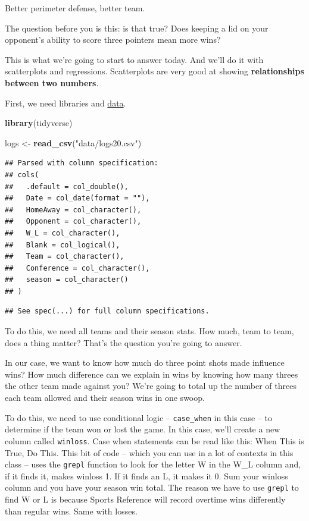 \documentclass[
]{book}
\newenvironment{Shaded}{\begin{snugshade}}{\end{snugshade}}
\newcommand{\KeywordTok}[1]{\textcolor[rgb]{0.13,0.29,0.53}{\textbf{#1}}}
\newcommand{\NormalTok}[1]{#1}
\newcommand{\StringTok}[1]{\textcolor[rgb]{0.31,0.60,0.02}{#1}}
\begin{document}
Better perimeter defense, better team.

The question before you is this: is that true? Does keeping a lid on your opponent's ability to score three pointers mean more wins?

This is what we're going to start to answer today. And we'll do it with scatterplots and regressions. Scatterplots are very good at showing \textbf{relationships between two numbers}.

First, we need libraries and \href{https://unl.box.com/s/yc01x7ae7r2jtuixo4j3s3s0ed7o5f8g}{data}.

\begin{Shaded}
\begin{Highlighting}[]
\KeywordTok{library}\NormalTok{(tidyverse)}
\end{Highlighting}
\end{Shaded}

\begin{Shaded}
\begin{Highlighting}[]
\NormalTok{logs <-}\StringTok{ }\KeywordTok{read_csv}\NormalTok{(}\StringTok{"data/logs20.csv"}\NormalTok{)}
\end{Highlighting}
\end{Shaded}

\begin{verbatim}
## Parsed with column specification:
## cols(
##   .default = col_double(),
##   Date = col_date(format = ""),
##   HomeAway = col_character(),
##   Opponent = col_character(),
##   W_L = col_character(),
##   Blank = col_logical(),
##   Team = col_character(),
##   Conference = col_character(),
##   season = col_character()
## )
\end{verbatim}

\begin{verbatim}
## See spec(...) for full column specifications.
\end{verbatim}

To do this, we need all teams and their season stats. How much, team to team, does a thing matter? That's the question you're going to answer.

In our case, we want to know how much do three point shots made influence wins? How much difference can we explain in wins by knowing how many threes the other team made against you? We're going to total up the number of threes each team allowed and their season wins in one swoop.

To do this, we need to use conditional logic -- \texttt{case\_when} in this case -- to determine if the team won or lost the game. In this case, we'll create a new column called \texttt{winloss}. Case when statements can be read like this: When This is True, Do This. This bit of code -- which you can use in a lot of contexts in this class -- uses the \texttt{grepl} function to look for the letter W in the W\_L column and, if it finds it, makes winloss 1. If it finds an L, it makes it 0. Sum your winloss column and you have your season win total. The reason we have to use \texttt{grepl} to find W or L is because Sports Reference will record overtime wins differently than regular wins. Same with losses.
\end{document}

